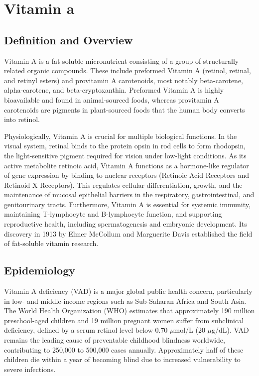 \chapter{Vitamin a}

\section*{Definition and Overview}
Vitamin A is a fat-soluble micronutrient consisting of a group of structurally related organic compounds. These include preformed Vitamin A (retinol, retinal, and retinyl esters) and provitamin A carotenoids, most notably beta-carotene, alpha-carotene, and beta-cryptoxanthin. Preformed Vitamin A is highly bioavailable and found in animal-sourced foods, whereas provitamin A carotenoids are pigments in plant-sourced foods that the human body converts into retinol.

Physiologically, Vitamin A is crucial for multiple biological functions. In the visual system, retinal binds to the protein opsin in rod cells to form rhodopsin, the light-sensitive pigment required for vision under low-light conditions. As its active metabolite retinoic acid, Vitamin A functions as a hormone-like regulator of gene expression by binding to nuclear receptors (Retinoic Acid Receptors and Retinoid X Receptors). This regulates cellular differentiation, growth, and the maintenance of mucosal epithelial barriers in the respiratory, gastrointestinal, and genitourinary tracts. Furthermore, Vitamin A is essential for systemic immunity, maintaining T-lymphocyte and B-lymphocyte function, and supporting reproductive health, including spermatogenesis and embryonic development. Its discovery in 1913 by Elmer McCollum and Marguerite Davis established the field of fat-soluble vitamin research.

\section*{Epidemiology}
Vitamin A deficiency (VAD) is a major global public health concern, particularly in low- and middle-income regions such as Sub-Saharan Africa and South Asia. The World Health Organization (WHO) estimates that approximately 190 million preschool-aged children and 19 million pregnant women suffer from subclinical deficiency, defined by a serum retinol level below 0.70 $\mu$mol/L (20 $\mu$g/dL). VAD remains the leading cause of preventable childhood blindness worldwide, contributing to 250,000 to 500,000 cases annually. Approximately half of these children die within a year of becoming blind due to increased vulnerability to severe infections.

